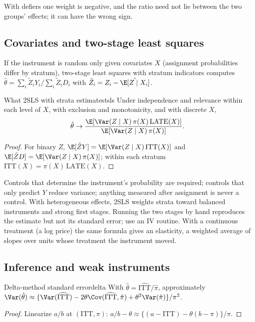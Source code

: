 \documentclass[11pt]{article}
\begin{document}
With defiers one weight is negative, and the ratio need not lie between the two groups' effects; it can have the wrong sign.

\subsection{Covariates and two-stage least squares}

If the instrument is random only given covariates $X$ (assignment probabilities differ by stratum), two-stage least squares with
stratum indicators computes $\hat\theta = \sum_i\tilde Z_iY_i/\sum_i\tilde Z_iD_i$ with $\tilde Z_i = Z_i - \hat\E[Z \mid X_i]$.

\begin{prop}{What 2SLS with strata estimates}{tsls}
Under independence and relevance within each level of $X$, with exclusion and monotonicity, and with discrete $X$,
\[
  \hat\theta \to \frac{\E[\Var(Z \mid X)\,\pi(X)\,\text{LATE}(X)]}{\E[\Var(Z \mid X)\,\pi(X)]}.
\]
\end{prop}
\begin{proof}
For binary $Z$, $\E[\tilde ZY] = \E[\Var(Z \mid X)\,\text{ITT}(X)]$ and $\E[\tilde ZD] = \E[\Var(Z \mid X)\,\pi(X)]$; within each stratum
$\text{ITT}(X) = \pi(X)\,\text{LATE}(X)$.
\end{proof}

Controls that determine the instrument's probability are required; controls that only predict $Y$ reduce variance; anything
measured after assignment is never a control. With heterogeneous effects, 2SLS weights strata toward balanced instruments and
strong first stages. Running the two stages by hand reproduces the estimate but not its standard error; use an IV routine. With a
continuous treatment (a log price) the same formula gives an elasticity, a weighted average of slopes over units whose treatment
the instrument moved.

\subsection{Inference and weak instruments}

\begin{prop}{Delta-method standard error}{delta}
With $\hat\theta = \widehat{\text{ITT}}/\hat\pi$, approximately
$\Var(\hat\theta) \approx \{\Var(\widehat{\text{ITT}}) - 2\theta\Cov(\widehat{\text{ITT}}, \hat\pi) + \theta^2\Var(\hat\pi)\}/\pi^2$.
\end{prop}
\begin{proof}
Linearize $a/b$ at $(\text{ITT}, \pi)$: $a/b - \theta \approx \{(a - \text{ITT}) - \theta(b - \pi)\}/\pi$.
\end{proof}
\end{document}
